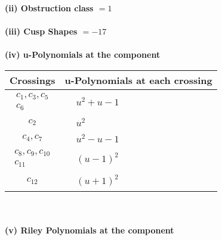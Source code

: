 \documentclass[1p]{elsarticle_modified}
\theoremstyle{definition}
\begin{document}
\flushleft \textbf{(ii) Obstruction class $= 1$}\\~\\
\flushleft \textbf{(iii) Cusp Shapes $= -17$}\\~\\
\newpage\renewcommand{\arraystretch}{1}
\flushleft \textbf{(iv) u-Polynomials at the component}\newline \\
\begin{tabular}{m{50pt}|m{274pt}}
Crossings & \hspace{64pt}u-Polynomials at each crossing \\
\hline $$\begin{aligned}c_{1},c_{3},c_{5}\\c_{6}\end{aligned}$$&$\begin{aligned}
&u^2+u-1
\end{aligned}$\\
\hline $$\begin{aligned}c_{2}\end{aligned}$$&$\begin{aligned}
&u^2
\end{aligned}$\\
\hline $$\begin{aligned}c_{4},c_{7}\end{aligned}$$&$\begin{aligned}
&u^2- u-1
\end{aligned}$\\
\hline $$\begin{aligned}c_{8},c_{9},c_{10}\\c_{11}\end{aligned}$$&$\begin{aligned}
&(u-1)^2
\end{aligned}$\\
\hline $$\begin{aligned}c_{12}\end{aligned}$$&$\begin{aligned}
&(u+1)^2
\end{aligned}$\\
\hline
\end{tabular}\\~\\
\newpage\renewcommand{\arraystretch}{1}
\flushleft \textbf{(v) Riley Polynomials at the component}\newline \\
\end{document}
